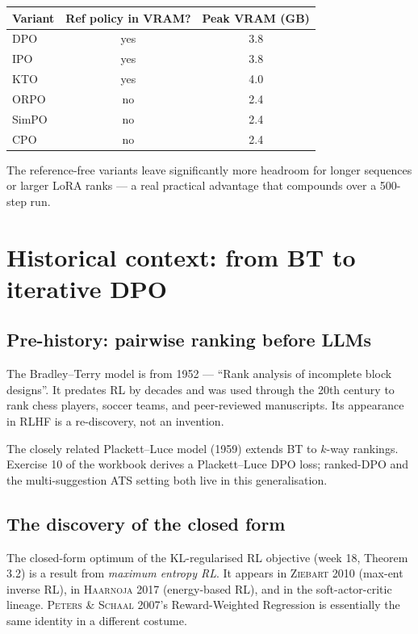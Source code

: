 \documentclass[11pt,oneside]{scrbook}
\begin{document}
\begin{center}
\small
\begin{tabular}{lcc}
\toprule
Variant & Ref policy in VRAM? & Peak VRAM (GB) \\
\midrule
DPO   & yes & 3.8 \\
IPO   & yes & 3.8 \\
KTO   & yes & 4.0 \\
ORPO  & no  & 2.4 \\
SimPO & no  & 2.4 \\
CPO   & no  & 2.4 \\
\bottomrule
\end{tabular}
\end{center}

The reference-free variants leave significantly more headroom for
longer sequences or larger LoRA ranks --- a real practical advantage
that compounds over a 500-step run.

\chapter{Historical context: from BT to iterative DPO}

\section{Pre-history: pairwise ranking before LLMs}

The Bradley--Terry model is from 1952 --- ``Rank analysis of
incomplete block designs''. It predates RL by decades and was used
through the 20th century to rank chess players, soccer teams, and
peer-reviewed manuscripts. Its appearance in RLHF is a re-discovery,
not an invention.

The closely related Plackett--Luce model (1959) extends BT to
$k$-way rankings. Exercise 10 of the workbook derives a
Plackett--Luce DPO loss; ranked-DPO and the multi-suggestion ATS
setting both live in this generalisation.

\section{The discovery of the closed form}

The closed-form optimum of the KL-regularised RL objective
(week 18, Theorem 3.2) is a result from \emph{maximum entropy RL}.
It appears in \textsc{Ziebart 2010} (max-ent inverse RL), in
\textsc{Haarnoja 2017} (energy-based RL), and in the soft-actor-critic
lineage. \textsc{Peters \& Schaal 2007}'s Reward-Weighted Regression
is essentially the same identity in a different costume.
\end{document}
